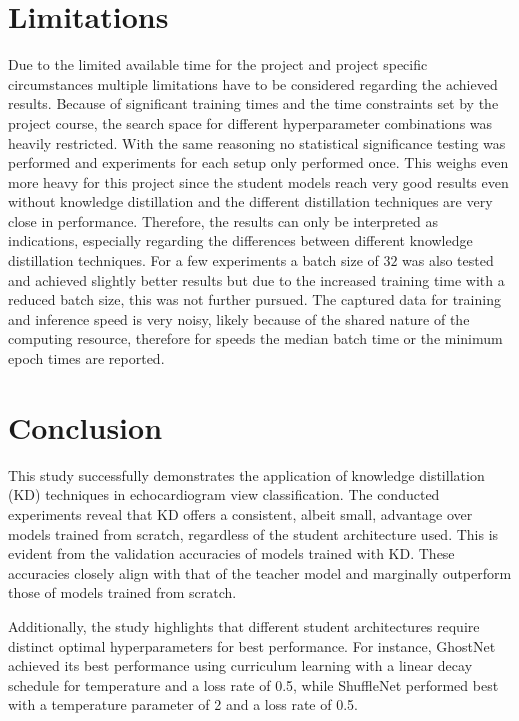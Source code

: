 \documentclass[14pt]{article}
\begin{document}
\section{Limitations}
Due to the limited available time for the project and project specific circumstances multiple limitations have to be considered regarding the achieved results. Because of significant training times and the time constraints set by the project course, the search space for different hyperparameter combinations was heavily restricted. With the same reasoning no statistical significance testing was performed and experiments for each setup only performed once. This weighs even more heavy for this project since the student models reach very good results even without knowledge distillation and the different distillation techniques are very close in performance. Therefore, the results can only be interpreted as indications, especially regarding the differences between different knowledge distillation techniques.
For a few experiments a batch size of $ 32 $ was also tested and achieved slightly better results but due to the increased training time with a reduced batch size, this was not further pursued.
The captured data for training and inference speed is very noisy, likely because of the shared nature of the computing resource, therefore for speeds the median batch time or the minimum epoch times are reported.

\section{Conclusion}

This study successfully demonstrates the application of knowledge distillation (KD) techniques in echocardiogram view classification. The conducted experiments reveal that KD offers a consistent, albeit small, advantage over models trained from scratch, regardless of the student architecture used. This is evident from the validation accuracies of models trained with KD. These accuracies closely align with that of the teacher model and marginally outperform those of models trained from scratch.

Additionally, the study highlights that different student architectures require distinct optimal hyperparameters for best performance. For instance, GhostNet achieved its best performance using curriculum learning with a linear decay schedule for temperature and a loss rate of 0.5, while ShuffleNet performed best with a temperature parameter of 2 and a loss rate of 0.5.
\end{document}
